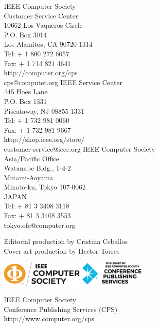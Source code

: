 \begin{center}
\small
\begin{multicols}{3}
IEEE Computer Society\\
Customer Service Center\\
10662 Los Vaqueros Circle\\
P.O. Box 3014\\
Los Alamitos, CA 90720-1314\\
Tel: + 1 800 272 6657\\
Fax: + 1 714 821 4641\\
http://computer.org/cps\\
cps@computer.org
\columnbreak
IEEE Service Center\\
445 Hoes Lane\\
P.O. Box 1331\\
Piscataway, NJ 08855-1331\\
Tel: + 1 732 981 0060\\
Fax: + 1 732 981 9667\\
http://shop.ieee.org/store/\\
customer-service@ieee.org
\columnbreak
IEEE Computer Society\\
Asia/Pacific Office\\
Watanabe Bldg., 1-4-2\\
Minami-Aoyama\\
Minato-ku, Tokyo 107-0062\\
JAPAN\\
Tel: + 81 3 3408 3118\\
Fax: + 81 3 3408 3553\\
tokyo.ofc@computer.org
\end{multicols}
\end{center}

\begin{center}
Editorial production by Cristina Ceballos\\
Cover art production by Hector Torres
\end{center}

\begin{center}
\begin{multicols}{2}
\includegraphics[height=0.5in]{../images/ieee-cs-logo}
\columnbreak
\includegraphics[height=0.5in]{../images/ieee-cps-logo}
\end{multicols}
\end{center}

\begin{center}
IEEE Computer Society\\
Conference Publishing Services (CPS)\\
http://www.computer.org/cps
\end{center}

